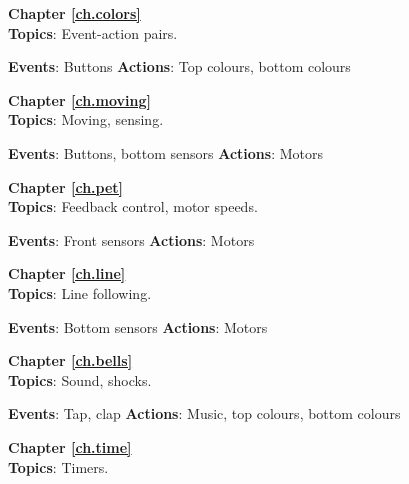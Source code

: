 {\centering \textbf{Chapter \ref{ch.colors}}\\}
\textbf{Topics}: Event-action pairs.

\textbf{Events}: Buttons \hfill \textbf{Actions}: Top colours, bottom colours

 \hfill {} \quad {}

\bigskip

{\centering \textbf{Chapter \ref{ch.moving}}\\}
\textbf{Topics}: Moving, sensing.

\textbf{Events}: Buttons, bottom sensors \hfill \textbf{Actions}: Motors

 \quad {} \hfill  {}

\bigskip

{\centering \textbf{Chapter \ref{ch.pet}}\\}
\textbf{Topics}: Feedback control, motor speeds.

\textbf{Events}: Front sensors \hfill \textbf{Actions}: Motors

 \hfill {}

\bigskip

{\centering \textbf{Chapter \ref{ch.line}}\\}
\textbf{Topics}: Line following.

\textbf{Events}: Bottom sensors \hfill \textbf{Actions}: Motors

 \hfill {}

\bigskip

{\centering \textbf{Chapter \ref{ch.bells}}\\}
\textbf{Topics}: Sound, shocks.

\textbf{Events}: Tap, clap \hfill \textbf{Actions}: Music, top colours, bottom colours

 \quad {} \hfill {} \quad {} \quad {}

\bigskip

{\centering \textbf{Chapter \ref{ch.time}}\\}
\textbf{Topics}: Timers.

